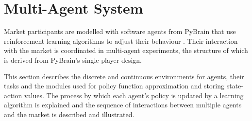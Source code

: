 %

\section{Multi-Agent System}
\label{sec:mas}
Market participants are modelled with software agents from PyBrain that use
reinforcement learning algorithms to adjust their behaviour \cite{schaul:2010}.
Their interaction with the market is coordinated in multi-agent experiments,
the structure of which is derived from PyBrain's single player design.

This section describes the discrete and continuous environments for agents,
their tasks and the modules used for policy function approximation and storing
state-action values.  The process by which each agent's policy is updated by a
learning algorithm is explained and the sequence of interactions between
multiple agents and the market is described and illustrated.

